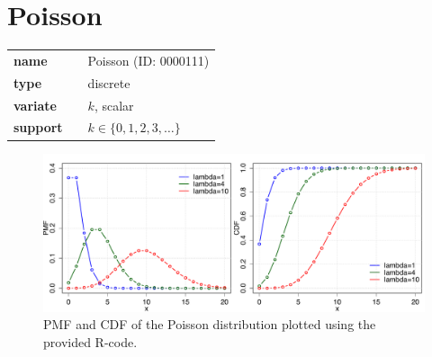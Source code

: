 %
\smallskip\section*{Poisson} 

  \bigskip 

\begin{tabular}{p{2cm}cl}
\textbf{name} & & Poisson (ID: 0000111)\\ 
 
\textbf{type} & & discrete \\ 

\textbf{variate} & & $k$, scalar \\ 

\textbf{support} & & $k \in \{0,1,2,3,\dots\}$
\end{tabular}

\begin{figure}[htb!]
\centering
  \includegraphics[width=140mm]{pics/Poisson_pmf_cdf.pdf}
 \caption{PMF and CDF of the Poisson distribution plotted using the provided R-code.}
 \label{fig:Poissonpmfcdf}
\end{figure}

